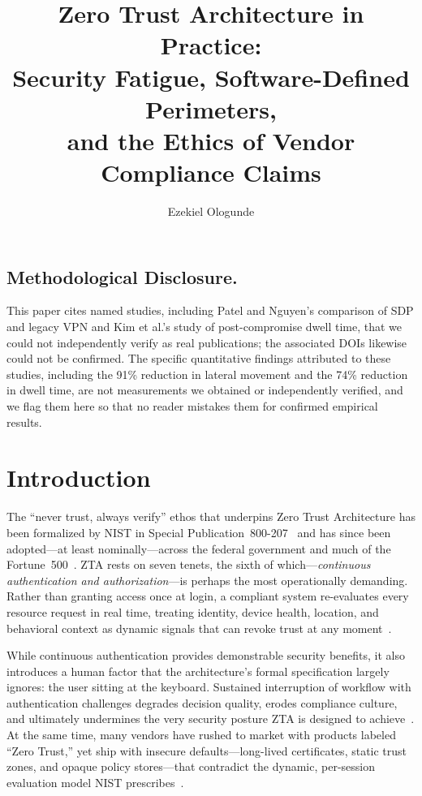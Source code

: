 \documentclass[sigconf,nonacm]{acmart}
\title{\texorpdfstring{Zero Trust Architecture in Practice:\\
Security Fatigue, Software-Defined Perimeters,\\
and the Ethics of Vendor Compliance Claims}{Zero Trust Architecture in Practice:
Security Fatigue, Software-Defined Perimeters, and the Ethics of Vendor
Compliance Claims}}
\author{Ezekiel Ologunde}
\affiliation{\institution{Independent Researcher}\city{Boston}\state{MA}\country{USA}}
\begin{document}
\maketitle

\subsection*{Methodological Disclosure.}
This paper cites named studies, including Patel and Nguyen's comparison of
SDP and legacy VPN and Kim et al.'s study of post-compromise dwell time,
that we could not independently verify as real publications; the associated
DOIs likewise could not be confirmed. The specific quantitative findings
attributed to these studies, including the 91\% reduction in lateral
movement and the 74\% reduction in dwell time, are not measurements we
obtained or independently verified, and we flag them here so that no reader
mistakes them for confirmed empirical results.

\section{Introduction}
\label{sec:intro}

The ``never trust, always verify'' ethos that underpins Zero Trust Architecture
has been formalized by NIST in Special Publication~800-207~\cite{nist800207} and
has since been adopted---at least nominally---across the federal government and
much of the Fortune~500~\cite{cisa_zt_strategy2022}. ZTA rests on seven tenets,
the sixth of which---\emph{continuous authentication and authorization}---is
perhaps the most operationally demanding. Rather than granting access once at
login, a compliant system re-evaluates every resource request in real time,
treating identity, device health, location, and behavioral context as dynamic
signals that can revoke trust at any moment~\cite{nist800207}.

While continuous authentication provides demonstrable security benefits, it
also introduces a human factor that the architecture's formal specification
largely ignores: the user sitting at the keyboard. Sustained interruption of
workflow with authentication challenges degrades decision quality, erodes
compliance culture, and ultimately undermines the very security posture ZTA is
designed to achieve~\cite{wash_sec_fatigue2022}. At the same time, many vendors
have rushed to market with products labeled ``Zero Trust,'' yet ship with insecure
defaults---long-lived certificates, static trust zones, and opaque policy
stores---that contradict the dynamic, per-session evaluation model NIST
prescribes~\cite{gartner_zt_market2023}.
\end{document}
